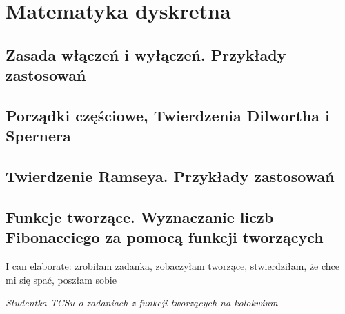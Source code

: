 {
\makeatletter
{}
\makeatother
\graphicspath{{../dyskretna}}

\let\realsection\section
\let\realsubsection\subsection
\let\section\subsection
\let\subsection\subsubsection
\let\subsubsection\paragraph

\chapter{Matematyka dyskretna} 


\realsection{Zasada włączeń i wyłączeń. Przykłady zastosowań}


\realsection{Porządki częściowe, Twierdzenia Dilwortha i Spernera}


\realsection{Twierdzenie Ramseya. Przykłady zastosowań}


\realsection{Funkcje tworzące. Wyznaczanie liczb Fibonacciego za pomocą funkcji tworzących}

\epigraph{I can elaborate: zrobiłam zadanka, zobaczyłam tworzące, stwierdziłam, że chce mi się spać, poszłam sobie}{\textit{Studentka TCSu o zadaniach z funkcji tworzących na kolokwium}}


}
